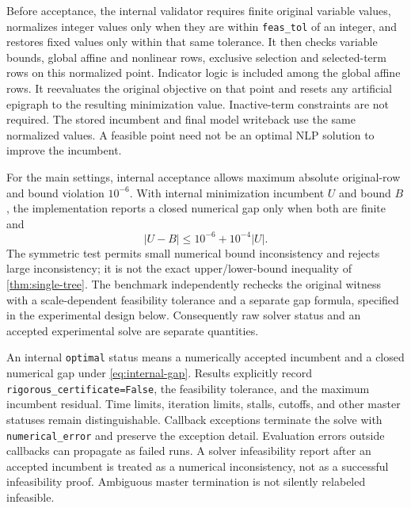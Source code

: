 Before acceptance, the internal validator requires finite original variable values, normalizes integer values only when they are within \texttt{feas\_tol} of an integer, and restores fixed values only within that same tolerance. It then checks variable bounds, global affine and nonlinear rows, exclusive selection and selected-term rows on this normalized point. Indicator logic is included among the global affine rows. It reevaluates the original objective on that point and resets any artificial epigraph to the resulting minimization value. Inactive-term constraints are not required. The stored incumbent and final model writeback use the same normalized values. A feasible point need not be an optimal NLP solution to improve the incumbent.

For the main settings, internal acceptance allows maximum absolute original-row and bound violation $10^{-6}$. With internal minimization incumbent $U$ and bound $B$, the implementation reports a closed numerical gap only when both are finite and
\begin{equation}\label{eq:internal-gap}
 |U-B|\le 10^{-6}+10^{-4}|U|.
\end{equation}
The symmetric test permits small numerical bound inconsistency and rejects large inconsistency; it is not the exact upper/lower-bound inequality of \cref{thm:single-tree}. The benchmark independently rechecks the original witness with a scale-dependent feasibility tolerance and a separate gap formula, specified in the experimental design below. Consequently raw solver status and an accepted experimental solve are separate quantities.

An internal \texttt{optimal} status means a numerically accepted incumbent and a closed numerical gap under \eqref{eq:internal-gap}. Results explicitly record \texttt{rigorous\_certificate=False}, the feasibility tolerance, and the maximum incumbent residual. Time limits, iteration limits, stalls, cutoffs, and other master statuses remain distinguishable. Callback exceptions terminate the solve with \texttt{numerical\_error} and preserve the exception detail. Evaluation errors outside callbacks can propagate as failed runs. A solver infeasibility report after an accepted incumbent is treated as a numerical inconsistency, not as a successful infeasibility proof. Ambiguous master termination is not silently relabeled infeasible.

